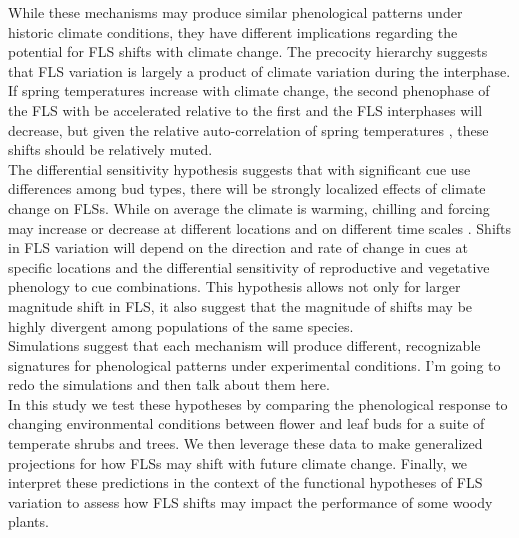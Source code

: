 \documentclass[11pt]{article}
\begin{document}
\noindent While these mechanisms may produce similar phenological patterns under historic climate conditions, they have different implications regarding the potential for FLS shifts with climate change. The precocity hierarchy suggests that FLS variation is largely a product of climate variation during the interphase. If spring temperatures increase with climate change, the second phenophase of the FLS with be accelerated relative to the first and the FLS interphases will decrease, but given the relative auto-correlation of spring temperatures \citep{}, these shifts should be relatively muted. \\

\noindent The differential sensitivity hypothesis suggests that with significant cue use differences among bud types, there will be strongly localized effects of climate change on FLSs. While on average the climate is warming, chilling and forcing may increase or decrease at different locations and on different time scales \citep{Ettinger}. Shifts in FLS variation will depend on the direction and rate of change in cues at specific locations and the differential sensitivity of reproductive and vegetative phenology to cue combinations. This hypothesis allows not only for larger magnitude shift in FLS, it also suggest that the magnitude of shifts may be highly divergent among populations of the same species.\\

\noindent Simulations suggest that each mechanism will produce different, recognizable signatures for phenological patterns under experimental conditions. I'm going to redo the simulations and then talk about them here.\\

\noindent In this study we test these hypotheses by comparing the phenological response to changing environmental conditions between flower and leaf buds for a suite of temperate shrubs and trees. We then leverage these data to make generalized projections for how FLSs may shift with future climate change. Finally, we interpret these predictions in the context of the functional hypotheses of FLS variation to assess how FLS shifts may impact the performance of some woody plants.\\ 
\end{document}
